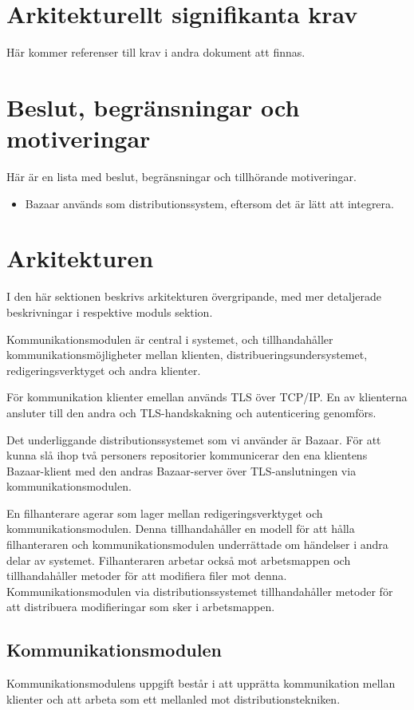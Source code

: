 \section{Arkitekturellt signifikanta krav}
Här kommer referenser till krav i andra dokument att finnas.
\section{Beslut, begränsningar och motiveringar}
Här är en lista med beslut, begränsningar och tillhörande motiveringar.
\begin{itemize}
\item Bazaar används som distributionssystem, eftersom det är lätt att integrera.
\end{itemize}
\section{Arkitekturen}
I den här sektionen beskrivs arkitekturen övergripande, med mer detaljerade beskrivningar i respektive moduls sektion.

Kommunikationsmodulen är central i systemet, och tillhandahåller kommunikationsmöjligheter mellan klienten, distribueringsundersystemet, redigeringsverktyget och andra klienter.

För kommunikation klienter emellan används TLS över TCP/IP. En av klienterna ansluter till den andra och TLS-handskakning och autenticering genomförs.

Det underliggande distributionssystemet som vi använder är Bazaar. För att kunna slå ihop två personers repositorier kommunicerar den ena klientens Bazaar-klient med den andras Bazaar-server över TLS-anslutningen via kommunikationsmodulen.

En filhanterare agerar som lager mellan redigeringsverktyget och kommunikationsmodulen. Denna tillhandahåller en modell för att hålla filhanteraren och kommunikationsmodulen underrättade om händelser i andra delar av systemet. Filhanteraren arbetar också mot arbetsmappen och tillhandahåller metoder för att modifiera filer mot denna. Kommunikationsmodulen via distributionssystemet tillhandahåller metoder för att distribuera modifieringar som sker i arbetsmappen.
\subsection{Kommunikationsmodulen}
Kommunikationsmodulens uppgift består i att upprätta kommunikation mellan klienter och att arbeta som ett mellanled mot distributionstekniken.

